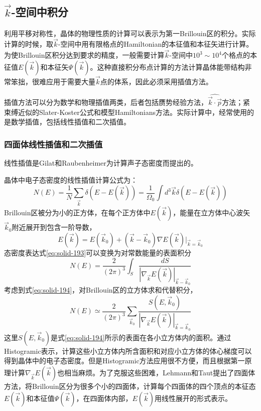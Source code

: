 

\subsection{$\vec k$-空间中积分}
利用平移对称性，晶体的物理性质的计算可以表示为第一Brillouin区的积分。实际计算的时候，取$\vec k$-空间中用有限格点的Hamiltonian的本征值和本征矢进行计算。为使Brillouin区积分达到要求的精度，一般需要计算$\vec k$-空间中$10^3\sim10^4$个格点的本征值$E(\vec k)$和本征矢$\Psi(\vec k)$。这种直接积分布点计算的方法计算晶体能带结构非常笨拙，很难应用于需要大量$\vec k$点的体系，因此必须采用插值方法。

插值方法可以分为数学和物理插值两类，后者包括赝势经验方法\cite{SSP18-165_1966}，$\widehat{\vec k\cdot\vec p}$方法\cite{Kane,JCP6-367_1938,Seitz,xie-lu}；紧束缚近似的Slater-Koster公式和模型Hamiltonians方法\cite{Nemoshkalenko-Aleshin}。实际计算中，经常使用的是数学插值，包括线性插值\cite{PR144-390_1966,PSSB54-469_1972}和二次插值\cite{PRA139-489_1965,PLA28-570_1969,AP67-15_1971}。

\subsubsection{四面体线性插值和二次插值}\label{Tetrahedron-Quadratic}
线性插值是Gilat和Raubenheimer\cite{PR144-390_1966}为计算声子态密度而提出的。

晶体中电子态密度的线性插值计算公式为：
\begin{equation}
  N(E)=\frac1N\sum_{\vec k}\delta(E-E(\vec k))=\frac1{\Omega_0}\int d^3\vec k\delta(E-E(\vec k)) 
  \label{eq:solid-193}
\end{equation}
Brillouin区被分为小的正方体，在每个正方体中$E(\vec k)$，能量在立方体中心波矢$\vec k_0$附近展开到包含一阶导数，
\begin{equation}
  E(\vec k)=E(\vec k_0)+(\vec k-\vec k_0)\nabla E(\vec k)|_{\vec k=\vec k_0}
  \label{eq:solid-194}
\end{equation}
态密度表达式\eqref{eq:solid-193}可以变换为对常数能量的表面积分
\begin{equation}
  N(E)=\frac2{(2\pi)^3}\int_S\frac{dS}{|\nabla_{\vec k}E(\vec k)|_{\vec k-\vec k_0}}
  \label{eq:solid-195}
\end{equation}
考虑到式\eqref{eq:solid-194}，对Brillouin区的立方体求和代替积分，
\begin{equation}
  N(E)\simeq\frac2{(2\pi)^3}\sum_{\vec k_0}\frac{S(E,\vec k_0)}{|\nabla_{\vec k}E(\vec k)|_{\vec k=\vec k_0}}
  \label{eq:solid-196}
\end{equation}
这里$S(E,\vec k_0)$是式\eqref{eq:solid-194}所示的表面在各小立方体内的面积。通过Histogramic表示，计算这些小立方体内所含面积和对应小立方体的体心梯度可以得到晶体中的电子态密度。但是Histogramic方法应用很不方便，而且根据第一原理计算$\nabla_{\vec k}E(\vec k)$也相当麻烦。为了克服这些困难，Lehmann和Taut提出了四面体方法\cite{PSSB54-469_1972}，将Brillouin区分为很多个小的四面体，计算每个四面体的四个顶点的本征态$E(\vec k)$和本征值$\Psi(\vec k)$，在四面体内部，$E(\vec k)$用线性展开的形式表示。

